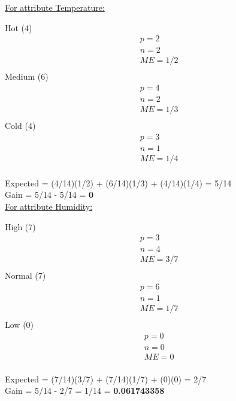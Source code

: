 \documentclass[8pt, fullpage,letterpaper]{article}
\begin{document}
\begin{enumerate}
\begin{enumerate}
\begin{enumerate}
\begin{enumerate}
\begin{itemize}
						\underline {For attribute Temperature:} 
							\vspace{-5pt}
							\begin{multicols}{3}
								Hot (4)
			 						\begin{align*}
									    	& p = 2\\
										& n = 2 \\
									    	& ME = 1/2\\
								      \end{align*}
								Medium (6)
			 						\begin{align*}
									    	& p = 4\\
										& n = 2 \\
									    	& ME = 1/3\\
								      \end{align*}
								Cold (4)
			 						\begin{align*}
									    	& p = 3\\
										& n = 1 \\
									    	& ME = 1/4\\
								      \end{align*}
							\end{multicols}
							\vspace{-20pt}
							Expected = (4/14)(1/2) + (6/14)(1/3) + (4/14)(1/4) = 5/14\\
							Gain = 5/14 - 5/14 = {\bf 0}\\

						\underline {For attribute Humidity:} 
							\vspace{-5pt}
							\begin{multicols}{3}
								High (7)
			 						\begin{align*}
									    	& p = 3\\
										& n = 4 \\
									    	& ME = 3/7\\
								      \end{align*}
								Normal (7)
			 						\begin{align*}
									    	& p = 6\\
										& n = 1 \\
									    	& ME = 1/7\\
								      \end{align*}
								Low (0)
			 						\begin{align*}
									    	& p = 0\\
										& n = 0 \\
									    	& ME = 0\\
								      \end{align*}
							\end{multicols}
							\vspace{-20pt}
							Expected = (7/14)(3/7) + (7/14)(1/7) + (0)(0) = 2/7\\
							Gain = 5/14 - 2/7 = 1/14 = {\bf 0.061743358}\\


\end{itemize}
\end{enumerate}
\end{enumerate}
\end{enumerate}
\end{enumerate}
\end{document}

